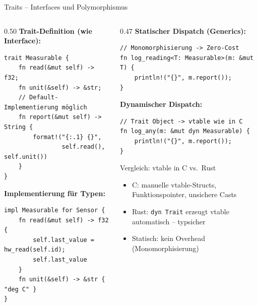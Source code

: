 \documentclass[%
  aspectratio=169,
  10pt
]{beamer}
\begin{document}
\begin{frame}[fragile]{Traits -- Interfaces und Polymorphismus}
  \begin{columns}[T]
    \begin{column}{0.50\textwidth}
      \textbf{Trait-Definition (wie Interface):}
\begin{lstlisting}
trait Measurable {
    fn read(&mut self) -> f32;
    fn unit(&self) -> &str;
    // Default-Implementierung möglich
    fn report(&mut self) -> String {
        format!("{:.1} {}",
                self.read(), self.unit())
    }
}
\end{lstlisting}
      \textbf{Implementierung für Typen:}
\begin{lstlisting}
impl Measurable for Sensor {
    fn read(&mut self) -> f32 {
        self.last_value = hw_read(self.id);
        self.last_value
    }
    fn unit(&self) -> &str { "deg C" }
}
\end{lstlisting}
    \end{column}
    \begin{column}{0.47\textwidth}
      \textbf{Statischer Dispatch (Generics):}
\begin{lstlisting}
// Monomorphisierung -> Zero-Cost
fn log_reading<T: Measurable>(m: &mut T) {
    println!("{}", m.report());
}
\end{lstlisting}
      \textbf{Dynamischer Dispatch:}
\begin{lstlisting}
// Trait Object -> vtable wie in C
fn log_any(m: &mut dyn Measurable) {
    println!("{}", m.report());
}
\end{lstlisting}
      \begin{block}{Vergleich: vtable in C vs.\ Rust}
        \small
        \begin{itemize}
          \item C: manuelle vtable-Structs,
                Funktionspointer, unsichere Casts
          \item Rust: \texttt{dyn Trait} erzeugt
                vtable automatisch -- typsicher
          \item Statisch: kein Overhead
                (Monomorphisierung)
        \end{itemize}
      \end{block}
    \end{column}
  \end{columns}
\end{frame}
\end{document}

